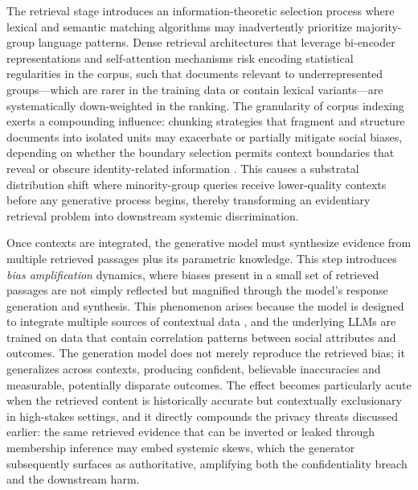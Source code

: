 \documentclass[11pt,a4paper]{article}
\begin{document}
The retrieval stage introduces an information-theoretic selection process where lexical and semantic matching algorithms may inadvertently prioritize majority-group language patterns. Dense retrieval architectures that leverage bi-encoder representations and self-attention mechanisms \cite{arxiv:2308.07107v3} risk encoding statistical regularities in the corpus, such that documents relevant to underrepresented groups---which are rarer in the training data or contain lexical variants---are systematically down-weighted in the ranking. The granularity of corpus indexing exerts a compounding influence: chunking strategies that fragment and structure documents into isolated units may exacerbate or partially mitigate social biases, depending on whether the boundary selection permits context boundaries that reveal or obscure identity-related information \cite{arxiv:2402.05131v3}. This causes a substratal distribution shift where minority-group queries receive lower-quality contexts before any generative process begins, thereby transforming an evidentiary retrieval problem into downstream systemic discrimination.

Once contexts are integrated, the generative model must synthesize evidence from multiple retrieved passages plus its parametric knowledge. This step introduces \emph{bias amplification} dynamics, where biases present in a small set of retrieved passages are not simply reflected but magnified through the model's response generation and synthesis. This phenomenon arises because the model is designed to integrate multiple sources of contextual data \cite{arxiv:2405.13792v1}, and the underlying LLMs are trained on data that contain correlation patterns between social attributes and outcomes. The generation model does not merely reproduce the retrieved bias; it generalizes across contexts, producing confident, believable inaccuracies and measurable, potentially disparate outcomes. The effect becomes particularly acute when the retrieved content is historically accurate but contextually exclusionary in high-stakes settings, and it directly compounds the privacy threats discussed earlier: the same retrieved evidence that can be inverted or leaked through membership inference may embed systemic skews, which the generator subsequently surfaces as authoritative, amplifying both the confidentiality breach and the downstream harm.
\end{document}
